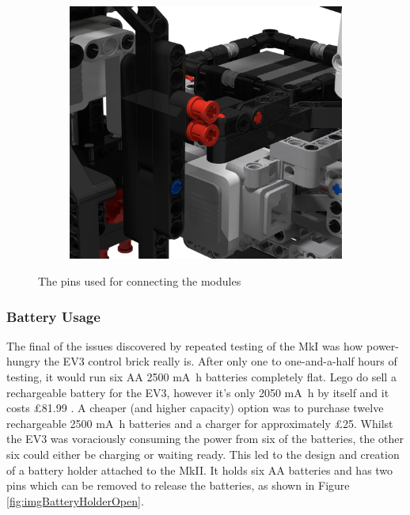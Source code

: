 \documentclass{report}
\begin{document}
\begin{figure}[H]
\begin{subfigure}[b]{0.25\textwidth}
			\label{fig:rdrModulePins2}
		\end{subfigure}
		\hspace{10mm}
		\begin{subfigure}[b]{0.25\textwidth}
			\includegraphics[width=\textwidth]{Resources/Images/rdrModulePins3.png}
			\label{fig:rdrModulePins3}
		\end{subfigure}
		\caption{The pins used for connecting the modules}
		\label{fig:rdrModulePins}
	\end{figure}
	
	\subsubsection{Battery Usage}
	
	The final of the issues discovered by repeated testing of the MkI was how power-hungry the EV3 control brick really is. After only one to one-and-a-half hours of testing, it would run six AA \num{2500} \si{\milli\ampere\hour} batteries completely flat. Lego do sell a rechargeable battery for the EV3, however it's only \num{2050} \si{\milli\ampere\hour} by itself and it costs \pounds81.99 \cite{Lego2018}. A cheaper (and higher capacity) option was to purchase twelve rechargeable \num{2500} \si{\milli\ampere\hour} batteries and a charger for approximately \pounds25. Whilst the EV3 was voraciously consuming the power from six of the batteries, the other six could either be charging or waiting ready. This led to the design and creation of a battery holder attached to the MkII. It holds six AA batteries and has two pins which can be removed to release the batteries, as shown in Figure \ref{fig:imgBatteryHolderOpen}.
	
\end{document}
